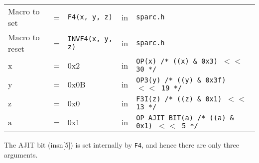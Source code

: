 \begin{enumerate}
  \begin{tabular}[h]{lclcl}
    Macro to set  &=& \texttt{F4(x, y, z)} &in& \texttt{sparc.h}     \\
    Macro to reset  &=& \texttt{INVF4(x, y, z)} &in& \texttt{sparc.h}     \\
    x &=& 0x2      &in& \texttt{OP(x)  /* ((x) \& 0x3)  $<<$ 30 */} \\
    y &=& 0x0B     &in& \texttt{OP3(y) /* ((y) \& 0x3f) $<<$ 19 */} \\
    z &=& 0x0      &in& \texttt{F3I(z) /* ((z) \& 0x1)  $<<$ 13 */} \\
    a &=& 0x1      &in& \texttt{OP\_AJIT\_BIT(a) /* ((a) \& 0x1)  $<<$ 5 */}
  \end{tabular}

  The AJIT bit  (insn[5]) is set internally by  \texttt{F4}, and hence
  there are only three arguments.


\end{enumerate}
